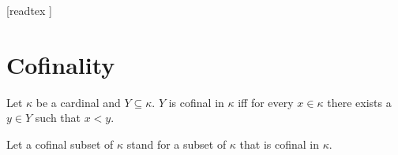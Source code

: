 \documentclass[10pt]{article}
\begin{document}
  \begin{imports}
    \begin{forthel}
      [readtex ]
    \end{forthel}
  \end{imports}


  \section*{Cofinality}

  \begin{forthel}
    \begin{definition}[id=SET_THEORY_06_5621203645212879,printid]
      Let $\kappa$ be a cardinal and $Y \subseteq \kappa$.
      $Y$ is cofinal in $\kappa$ iff for every $x \in \kappa$ there exists a $y \in Y$ such that $x < y$.
    \end{definition}

    Let a cofinal subset of $\kappa$ stand for a subset of $\kappa$ that is cofinal in $\kappa$.
  \end{forthel}
\end{document}
